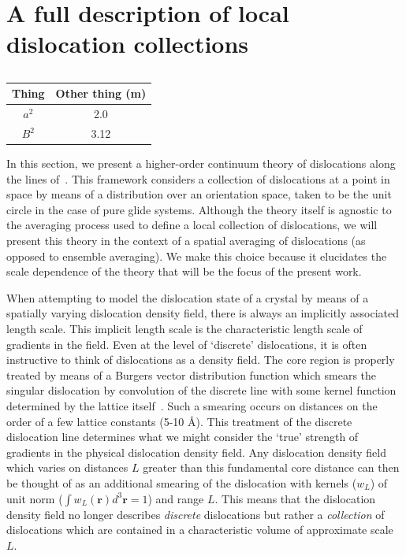 \section{A full description of local dislocation collections \label{sec:2_localcollections}}

\begin{table}[htbp]
    \centering
    \caption{}
    \begin{tabular}{cS}
        \toprule
        Thing & {Other thing (m)} \\
        \midrule
        $a^2$ & 2.0 \\
        $B^2$ & 3.12 \\
        \bottomrule
    \end{tabular}
\end{table}

In this section, we present a higher-order continuum theory of dislocations along the lines of~\cite{Hochrainer2007}. This framework considers a collection of dislocations at a point in space by means of a distribution over an orientation space, taken to be the unit circle in
the case of pure glide systems. Although the theory itself is agnostic
to the averaging process used to define a local collection of
dislocations, we will present this theory in the context of a spatial
averaging of dislocations (as opposed to ensemble averaging). We make
this choice because it elucidates the scale dependence of the theory
that will be the focus of the present work.

When attempting to model the dislocation state of a crystal by means of
a spatially varying dislocation density field, there is always an
implicitly associated length scale. This implicit length scale is the
characteristic length scale of gradients in the field. Even at the level
of `discrete' dislocations, it is often instructive to think of
dislocations as a density field. The core region is properly treated by means of a Burgers vector distribution function which smears the singular dislocation by convolution of the discrete line with some kernel
function determined by the lattice itself~\cite{Po2018,Cai2006}. Such a smearing occurs on distances on the order of a few lattice constants (5-10 \AA). This treatment of the discrete
dislocation line determines what we might consider the `true' strength of
gradients in the physical dislocation density field. Any dislocation density
field which varies on distances \(L\) greater than this fundamental core
distance can then be thought of as an additional smearing of the
dislocation with kernels (\(w_{L}\)) of unit norm
(\(\int w_{L}\left( \boldsymbol{r} \right)d^{3}\boldsymbol{r }=1\)) and range
\(L.\) This means that the dislocation density field no longer describes
\emph{discrete} dislocations but rather a \emph{collection} of
dislocations which are contained in a characteristic volume of
approximate scale \(L\).

